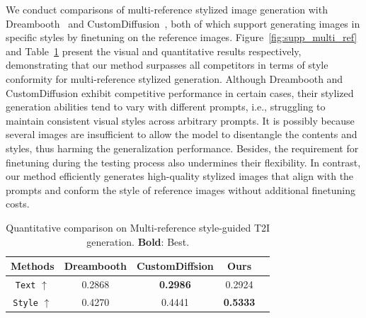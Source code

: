 We conduct comparisons of multi-reference stylized image generation with Dreambooth~\cite{dreambooth} and CustomDiffusion~\cite{customdiffusion}, both of which support generating images in specific styles by finetuning on the reference images. Figure~\ref{fig:supp_multi_ref} and Table~\ref{tab:supp_multi_ref} present the visual and quantitative results respectively, demonstrating that our method surpasses all competitors in terms of style conformity for multi-reference stylized generation. Although Dreambooth and CustomDiffusion exhibit competitive performance in certain cases, their stylized generation abilities tend to vary with different prompts, i.e., struggling to maintain consistent visual styles across arbitrary prompts. It is possibly because several images are insufficient to allow the model to disentangle the contents and styles, thus harming the generalization performance.
Besides, the requirement for finetuning during the testing process also undermines their flexibility. In contrast, our method efficiently generates high-quality stylized images that align with the prompts and conform the style of reference images without additional finetuning costs.


%
\begin{table}[!h]
\centering
\caption{Quantitative comparison on Multi-reference style-guided T2I generation. \textbf{Bold}: Best.}
\label{tab:supp_multi_ref}
\vspace{-1.0em}
  \begin{tabular}{ccccc} %
    \hline
    Methods & Dreambooth & CustomDiffsion  & Ours \\
    \hline
    \texttt{Text} $\uparrow$ & 0.2868 & \textbf{0.2986} & 0.2924 \\
    \texttt{Style} $\uparrow$ & 0.4270 & 0.4441 & \textbf{0.5333} \\
    \hline
  \end{tabular}
\end{table}



